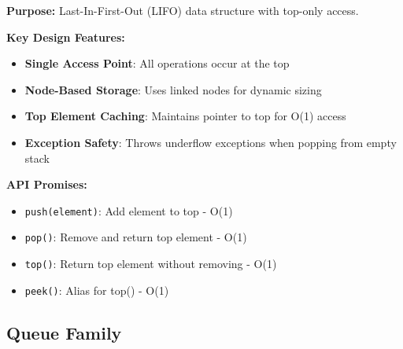 \documentclass[11pt,a4paper]{article}
\begin{document}
\textbf{Purpose:} Last-In-First-Out (LIFO) data structure with top-only access.

\textbf{Key Design Features:}
\begin{itemize}
    \item \textbf{Single Access Point}: All operations occur at the top
    \item \textbf{Node-Based Storage}: Uses linked nodes for dynamic sizing
    \item \textbf{Top Element Caching}: Maintains pointer to top for O(1) access
    \item \textbf{Exception Safety}: Throws underflow exceptions when popping from empty stack
\end{itemize}

\textbf{API Promises:}
\begin{itemize}
    \item \texttt{push(element)}: Add element to top - O(1)
    \item \texttt{pop()}: Remove and return top element - O(1)
    \item \texttt{top()}: Return top element without removing - O(1)
    \item \texttt{peek()}: Alias for top() - O(1)
\end{itemize}

\subsection{Queue Family}
\end{document}
